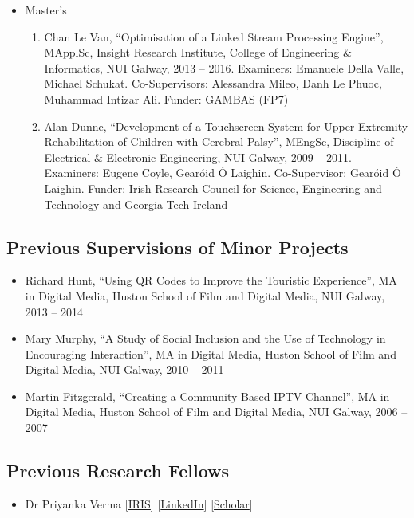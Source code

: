 \documentclass[10pt,a4paper]{res} %
\begin{document}
\begin{resume}
\begin{itemize}
\item Master's
\begin{enumerate} \itemsep -2pt
\item Chan Le Van, ``Optimisation of a Linked Stream Processing Engine'', MApplSc, Insight Research Institute, College of Engineering \& Informatics, NUI Galway, 2013 -- 2016. Examiners: Emanuele Della Valle, Michael Schukat. Co-Supervisors: Alessandra Mileo, Danh Le Phuoc, Muhammad Intizar Ali. Funder: GAMBAS (FP7)
\item Alan Dunne, ``Development of a Touchscreen System for Upper Extremity Rehabilitation of Children with Cerebral Palsy'', MEngSc, Discipline of Electrical \& Electronic Engineering, NUI Galway, 2009 -- 2011. Examiners: Eugene Coyle, Gear\'{o}id \'{O} Laighin. Co-Supervisor: Gear\'{o}id \'{O} Laighin. Funder: Irish Research Council for Science, Engineering and Technology and Georgia Tech Ireland
\end{enumerate}
\end{itemize}

\subsection*{Previous Supervisions of Minor Projects}

\begin{itemize} \itemsep -2pt
\item Richard Hunt, ``Using QR Codes to Improve the Touristic Experience'', MA in Digital Media, Huston School of Film and Digital Media, NUI Galway, 2013 -- 2014
\item Mary Murphy, ``A Study of Social Inclusion and the Use of Technology in Encouraging Interaction'', MA in Digital Media, Huston School of Film and Digital Media, NUI Galway, 2010 -- 2011
\item Martin Fitzgerald, ``Creating a Community-Based IPTV Channel'', MA in Digital Media, Huston School of Film and Digital Media, NUI Galway, 2006 -- 2007
\end{itemize}

\subsection*{Previous Research Fellows}

\begin{itemize} \itemsep -2pt
\item Dr Priyanka Verma
[\href{https://universityofgalway.ie/science-engineering/staff-profiles/priyankaverma/}{IRIS}]
[\href{https://www.linkedin.com/in/priyankavermaphd/}{LinkedIn}]
[\href{https://scholar.google.com/citations?hl=en&user=BNKQ-UgAAAAJ}{Scholar}]
\end{itemize}


\end{resume}
\end{document}
